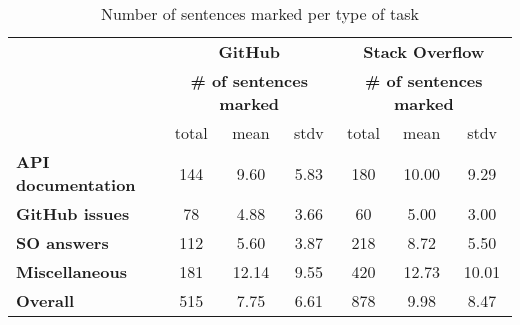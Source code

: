 \begin{table}[H]
\centering    
\caption{Number of sentences marked per type of task}
\label{tbl:corpus-annotation-summary-by-task}
\begin{scriptsize}
\begin{threeparttable}
\begin{tabular}{lcccccc}



& \multicolumn{3}{c}{\textbf{GitHub}} & \multicolumn{3}{c}{\textbf{Stack Overflow}} \\

& \multicolumn{3}{c}{\textbf{\# of sentences marked}} 
& \multicolumn{3}{c}{\textbf{\# of sentences marked}}
\\ \cmidrule(l){2-4}  \cmidrule(l){5-7} 

& total & mean & stdv 
%
& total & mean & stdv
\\

\hline

\textbf{API documentation} 
& 144 & 9.60 & 5.83 %
& 180 & 10.00 & 9.29 %
\\
\textbf{GitHub issues} 
& 78 & 4.88 & 3.66 %
& 60 & 5.00 & 3.00 %
\\
\textbf{SO answers} 
& 112 & 5.60 & 3.87 %
& 218 & 8.72 & 5.50 %
\\
\textbf{Miscellaneous} 
& 181 & 12.14 & 9.55 %
& 420 & 12.73 & 10.01 %
\\

\hline
\textbf{Overall} 
& 515 & 7.75 & 6.61 %
& 878 & 9.98 & 8.47 %
\\
\hline

\end{tabular}
\end{threeparttable}
\end{scriptsize}
\end{table}

